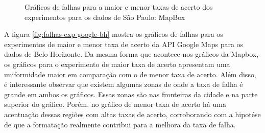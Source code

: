\begin{figure}[ht]
    \caption{Gráficos de falhas para a maior e menor taxas de acerto dos experimentos para os dados de São Paulo: MapBox}
    \label{fig:falhas-exp-mapbox-sp}
\end{figure}

A figura \ref{fig:falhas-exp-google-bh} mostra os gráficos de falhas para os experimentos de maior e menor taxa de acerto da API Google Maps para os dados de Belo Horizonte. Da mesma forma que acontece nos gráficos da Mapbox, os gráficos para o experimento de maior taxa de acerto apresentam uma uniformidade maior em comparação com o de menor taxa de acerto. Além disso, é interessante observar que existem algumas zonas de onde a taxa de falha é grande em ambos os gráficos. Essas zonas são nas fronteiras da cidade e na parte superior do gráfico. Porém, no gráfico de menor taxa de acerto há uma acentuação dessas regiões com altas taxas de acerto, corroborando com a hipotése de que a formatação realmente contribui para a melhora da taxa de falha. 

